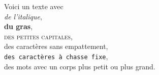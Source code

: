 \documentclass[12pt]{article}
\begin{document}
\noindent Voici un texte avec \\
\textit{de l'italique}, \\
\textbf{du gras}, \\
\textsc{des petites capitales}, \\
\textsf{des caractères sans empattement}, \\
\texttt{des caractères à chasse fixe}, \\
des mots avec {\small{un corps plus petit}} ou {\large{plus grand}}.
\end{document}
